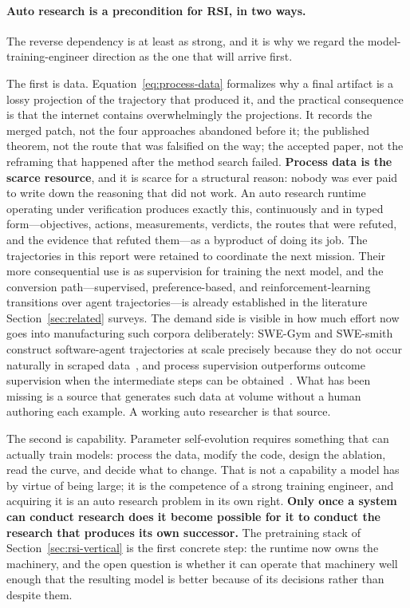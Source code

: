 \paragraph{Auto research is a precondition for RSI, in two ways.}
The reverse dependency is at least as strong, and it is why we regard the
model-training-engineer direction as the one that will arrive first.

The first is data. Equation~\ref{eq:process-data} formalizes why a final artifact is a
lossy projection of the trajectory that produced it, and the practical consequence is
that the internet contains overwhelmingly the projections. It records the merged
patch, not the four approaches abandoned before it; the published theorem, not the
route that was falsified on the way; the accepted paper, not the reframing that
happened after the method search failed. \textbf{Process data is the scarce
resource}, and it is scarce for a structural reason: nobody was ever paid to write
down the reasoning that did not work. An auto research runtime operating under
verification produces exactly this, continuously and in typed form---objectives,
actions, measurements, verdicts, the routes that were refuted, and the evidence that
refuted them---as a byproduct of doing its job. The trajectories in this report were
retained to coordinate the next mission. Their more consequential use is as
supervision for training the next model, and the conversion path---supervised,
preference-based, and reinforcement-learning transitions over agent trajectories---is
already established in the literature Section~\ref{sec:related} surveys. The demand
side is visible in how much effort now goes into manufacturing such corpora
deliberately: SWE-Gym and SWE-smith construct software-agent trajectories at scale
precisely because they do not occur naturally in scraped
data~\citep{pan2024swegym,yang2025swesmith}, and process supervision outperforms
outcome supervision when the intermediate steps can be
obtained~\citep{lightman2023verify}. What has been missing is a source that generates
such data at volume without a human authoring each example. A working auto researcher
is that source.

The second is capability. Parameter self-evolution requires something that can
actually train models: process the data, modify the code, design the ablation, read
the curve, and decide what to change. That is not a capability a model has by virtue
of being large; it is the competence of a strong training engineer, and acquiring it
is an auto research problem in its own right. \textbf{Only once a system can conduct
research does it become possible for it to conduct the research that produces its own
successor.} The pretraining stack of Section~\ref{sec:rsi-vertical} is the first
concrete step: the runtime now owns the machinery, and the open question is whether
it can operate that machinery well enough that the resulting model is better because
of its decisions rather than despite them.

